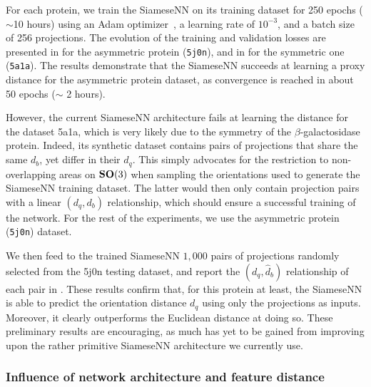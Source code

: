 For each protein, we train the SiameseNN on its training dataset for 250 epochs ($\sim$10 hours) using an Adam optimizer~\cite{kingma2014adam}, a learning rate of $10^{-3}$, and a batch size of 256 projections.
The evolution of the training and validation losses are presented in  for the asymmetric protein (\texttt{5j0n}), and in  for the symmetric one (\texttt{5a1a}).
The results demonstrate that the SiameseNN succeeds at learning a proxy distance for the asymmetric protein dataset, as convergence is reached in about 50 epochs ($\sim$ 2 hours).

However, the current SiameseNN architecture fails at learning the distance for the dataset 5a1a, which is very likely due to the symmetry of the $\beta$-galactosidase protein.
Indeed, its synthetic dataset contains pairs of projections that share the same $d_b$, yet differ in their $d_q$.
This simply advocates for the restriction to non-overlapping areas on $\mathrm{\mathbf{SO}}(3)$ when sampling the orientations used to generate the SiameseNN training dataset.
The latter would then only contain projection pairs with a linear $(d_q,d_b)$ relationship, which should ensure a successful training of the network.
For the rest of the experiments, we use the asymmetric protein (\texttt{5j0n}) dataset.

We then feed to the trained SiameseNN $1,000$ pairs of projections randomly selected from the 5j0n testing dataset, and report the $(d_q,\widehat{d}_b)$ relationship of each pair in .
These results confirm that, for this protein at least, the SiameseNN is able to predict the orientation distance $d_q$ using only the projections as inputs.
Moreover, it clearly outperforms the Euclidean distance at doing so.
These preliminary results are encouraging, as much has yet to be gained from improving upon the rather primitive SiameseNN architecture we currently use.

\subsubsection{Influence of network architecture and feature distance}


